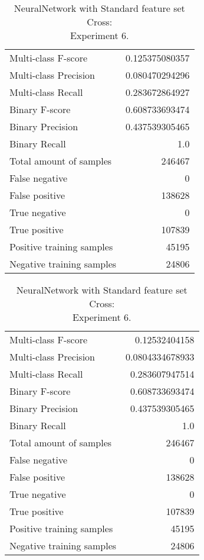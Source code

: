 \begin{table}[H]
\begin{minipage}{0.5\textwidth}
\caption{NeuralNetwork with Standard feature set Cross: \\Experiment 5.}
\centering
\begin{tabular}{l r}
\toprule
Multi-class F-score & 0.125375080357 \\
Multi-class Precision & 0.080470294296 \\
Multi-class Recall & 0.283672864927 \\
\midrule
Binary F-score & 0.608733693474 \\
Binary Precision & 0.437539305465 \\
Binary Recall & 1.0 \\
\midrule
Total amount of samples & 246467 \\
False negative & 0 \\
False positive & 138628 \\
True negative & 0 \\
True positive & 107839 \\
\midrule
Positive training samples & 45195 \\
Negative training samples & 24806 \\
\bottomrule
\end{tabular}
\end{minipage}
\hfillx
\begin{minipage}{0.5\textwidth}
\caption{NeuralNetwork with Standard feature set Cross: \\Experiment 6.}
\centering
\begin{tabular}{l r}
\toprule
Multi-class F-score & 0.12532404158 \\
Multi-class Precision & 0.0804334678933 \\
Multi-class Recall & 0.283607947514 \\
\midrule
Binary F-score & 0.608733693474 \\
Binary Precision & 0.437539305465 \\
Binary Recall & 1.0 \\
\midrule
Total amount of samples & 246467 \\
False negative & 0 \\
False positive & 138628 \\
True negative & 0 \\
True positive & 107839 \\
\midrule
Positive training samples & 45195 \\
Negative training samples & 24806 \\
\bottomrule
\end{tabular}
\end{minipage}
\end{table}
